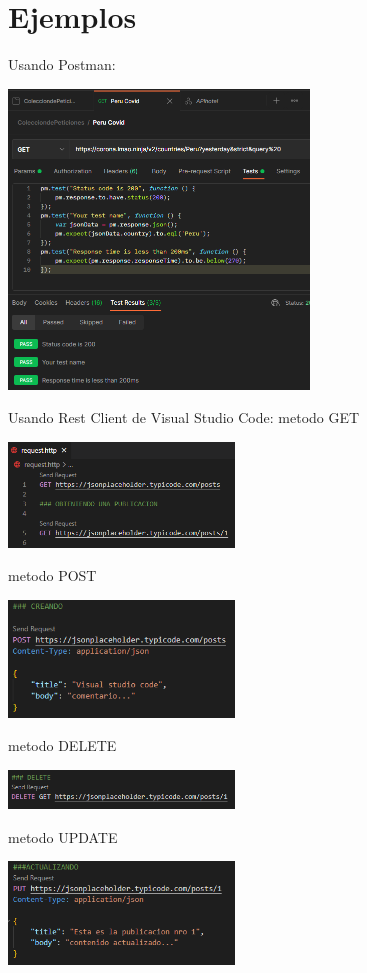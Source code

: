\documentclass[twoside,twocolumn]{article}
\begin{document}
\section{Ejemplos}
Usando Postman:
\begin{center}
	\includegraphics[width=8cm]{./imagenes/test1.png} 
	\end{center}
Usando Rest Client de Visual Studio Code:
metodo GET
\begin{center}
	\includegraphics[width=6cm]{./imagenes/1.png} 
	\end{center}
metodo POST
\begin{center}
	\includegraphics[width=6cm]{./imagenes/2.png} 
	\end{center}
metodo DELETE
\begin{center}
	\includegraphics[width=6cm]{./imagenes/3.png} 
	\end{center}
metodo UPDATE
\begin{center}
	\includegraphics[width=6cm]{./imagenes/4.png} 
	\end{center}
\end{document}
